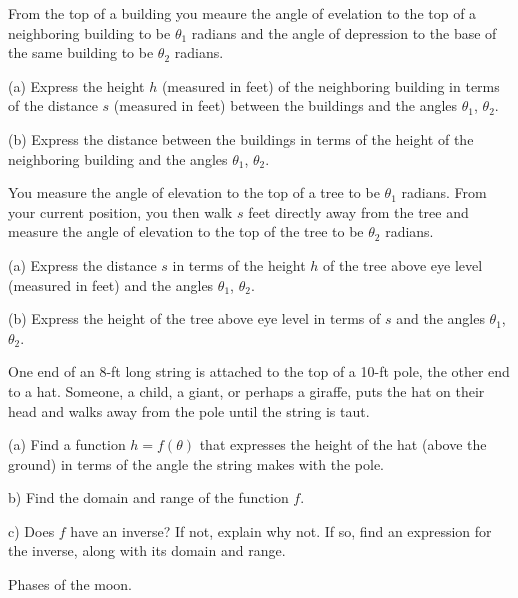 \documentclass{ximera}
\begin{document}
\begin{question}  \label{Qewrdfg67}
From the top of a building you meaure the angle of evelation to the top of a neighboring building to be $\theta_1$ radians and the angle of depression to the base of the same building to be $\theta_2$ radians.

(a) Express the height $h$ (measured in feet) of the neighboring building in terms of the distance $s$ (measured in feet) between the buildings and the angles $\theta_1$, $\theta_2$.

(b) Express the distance between the buildings in terms of the height of the neighboring building and the angles $\theta_1$, $\theta_2$.

\end{question}

\begin{question}  \label{Qerdft543}
You measure the angle of elevation to the top of a tree to be $\theta_1$ radians. From your current position, you then walk $s$ feet directly away from the tree and measure the angle of elevation to the top of the tree to be $\theta_2$ radians.

(a) Express the distance $s$ in terms of the height $h$ of the tree above eye level (measured in feet) and the angles $\theta_1$, $\theta_2$.

(b) Express the height of the tree above eye level in terms of $s$ and the angles $\theta_1$, $\theta_2$.
\end{question}


\begin{question}  \label{Qtgb677432}
One end of an 8-ft long string is attached to the top of a 10-ft pole, the other end to a hat. Someone, a child, a giant, or perhaps a giraffe, puts the hat on their head and walks away from the pole until the string is taut.

(a) Find a function $h=f(\theta)$ that expresses the height of the hat (above the ground) in terms of the angle the string makes with the pole.

b) Find the domain and range of the function $f$.

c) Does $f$ have an inverse? If not, explain why not. If so, find an expression for the inverse, along with its domain and range.
\end{question}




\begin{question} \label{Q8:RightTriangle}
Phases of the moon.

\begin{exploration}

 
\begin{onlineOnly}
    \begin{center}
\end{center}
\end{onlineOnly}
\end{exploration}

\end{question}
\end{document}
